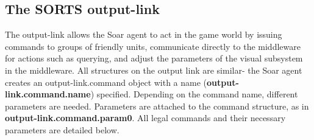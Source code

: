 \subsection{The SORTS output-link}
\label{sec:output-link}

The output-link allows the Soar agent to act in the game world by issuing commands to groups of friendly units, communicate directly to the middleware for actions such as querying,
and adjust the parameters of the visual subsystem in the middleware. All structures on the output link are similar- the Soar agent creates an output-link.command object with a name (\textbf{output-link.command.name}) specified. Depending on the command name, different parameters are needed. Parameters are attached to the command structure, as in \textbf{output-link.command.param0}. All legal commands and their necessary parameters are detailed below.


